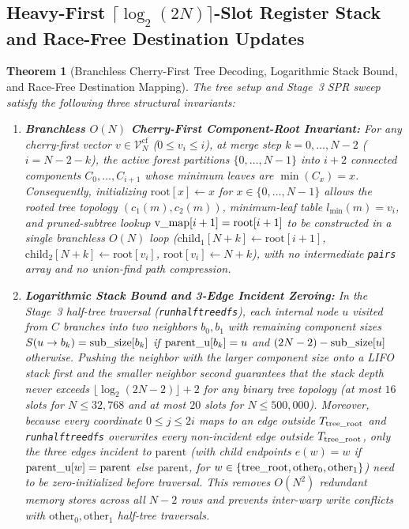 \documentclass[11pt,a4paper]{article}
\makeatletter
\DeclareRobustCommand{\_}{\ifmmode\nfss@text{\textunderscore}\else\textunderscore\allowbreak\fi}
\newtheorem{theorem}{Theorem}[section]
\theoremstyle{definition}
\makeatother
\begin{document}
\subsection{Heavy-First $\lceil \log_2(2N) \rceil$-Slot Register Stack and Race-Free Destination Updates}

\begin{theorem}[Branchless Cherry-First Tree Decoding, Logarithmic Stack Bound, and Race-Free Destination Mapping]
\label{thm:heavy_stack}
The tree setup and Stage~3 SPR sweep satisfy the following three structural invariants:
\begin{enumerate}
    \item \textbf{Branchless $O(N)$ Cherry-First Component-Root Invariant:} For any cherry-first vector $v \in \mathcal{V}^{\text{cf}}_N$ ($0 \le v_i \le i$), at merge step $k = 0, \dots, N-2$ ($i = N - 2 - k$), the active forest partitions $\{0, \dots, N-1\}$ into $i + 2$ connected components $C_0, \dots, C_{i+1}$ whose minimum leaves are $\min(C_x) = x$. Consequently, initializing $\text{root}[x] \leftarrow x$ for $x \in \{0, \dots, N-1\}$ allows the rooted tree topology $(c_1(m), c_2(m))$, minimum-leaf table $l_{\min}(m) = v_i$, and pruned-subtree lookup $\text{v\_map}[i+1] = \text{root}[i+1]$ to be constructed in a single branchless $O(N)$ loop ($\text{child}_1[N+k] \leftarrow \text{root}[i+1]$, $\text{child}_2[N+k] \leftarrow \text{root}[v_i]$, $\text{root}[v_i] \leftarrow N+k$), with no intermediate \texttt{pairs} array and no union-find path compression.
    \item \textbf{Logarithmic Stack Bound and 3-Edge Incident Zeroing:} In the Stage~3 half-tree traversal (\texttt{run\_half\_tree\_dfs}), each internal node $u$ visited from $C$ branches into two neighbors $b_0, b_1$ with remaining component sizes $S(u \to b_k) = \text{sub\_size}[b_k]$ if $\text{parent\_u}[b_k] = u$ and $(2N-2) - \text{sub\_size}[u]$ otherwise. Pushing the neighbor with the larger component size onto a LIFO stack first and the smaller neighbor second guarantees that the stack depth never exceeds $\lfloor \log_2(2N-2) \rfloor + 2$ for any binary tree topology (at most $16$ slots for $N \le 32{,}768$ and at most $20$ slots for $N \le 500{,}000$). Moreover, because every coordinate $0 \le j \le 2i$ maps to an edge outside $T_{\text{tree\_root}}$ and \texttt{run\_half\_tree\_dfs} overwrites every non-incident edge outside $T_{\text{tree\_root}}$, only the three edges incident to $\text{parent}$ (with child endpoints $e(w) = w$ if $\text{parent\_u}[w] = \text{parent}$ else $\text{parent}$, for $w \in \{\text{tree\_root}, \text{other}_0, \text{other}_1\}$) need to be zero-initialized before traversal. This removes $O(N^2)$ redundant memory stores across all $N-2$ rows and prevents inter-warp write conflicts with $\text{other}_0, \text{other}_1$ half-tree traversals.

\end{enumerate}
\end{theorem}
\end{document}

